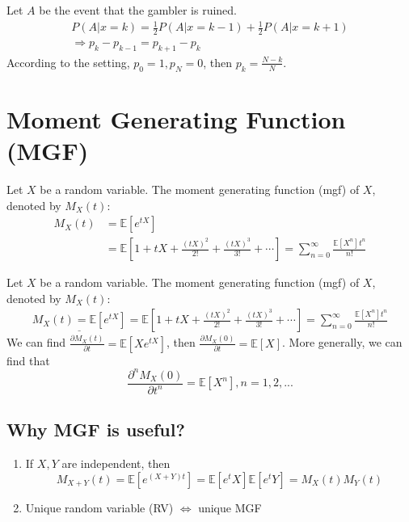 \documentclass[11pt]{elegantbook}
\begin{document}
Let $A$ be the event that the gambler is ruined.
\begin{equation}
    \begin{aligned}
        P(A|x=k)=\frac{1}{2}P(A|x=k-1)+\frac{1}{2}P(A|x=k+1)\\
        \Rightarrow p_k-p_{k-1}=p_{k+1}-p_k
    \end{aligned}
    \nonumber
\end{equation}
According to the setting, $p_0=1,p_N=0$, then $p_k=\frac{N-k}{N}$.

\section{Moment Generating Function (MGF)}
\begin{definition}
    Let $X$ be a random variable. The moment generating function (mgf) of $X$, denoted by $M_X(t)$:
    \begin{equation}
        \begin{aligned}
            M_X(t)&=\mathbb{E}[e^{tX}]\\&=\mathbb{E}\left[1+tX+\frac{(tX)^2}{2!}+\frac{(tX)^3}{3!}+\cdots\right]=\sum_{n=0}^\infty\frac{\mathbb{E}[X^n]t^n}{n!}
        \end{aligned}
        \nonumber
    \end{equation}
\end{definition}
Let $X$ be a random variable. The moment generating function (mgf) of $X$, denoted by $M_X(t)$:
\begin{equation}
    \begin{aligned}
        \underline{M_X(t)=\mathbb{E}[e^{tX}]}=\mathbb{E}\left[1+tX+\frac{(tX)^2}{2!}+\frac{(tX)^3}{3!}+\cdots\right]=\sum_{n=0}^\infty\frac{\mathbb{E}[X^n]t^n}{n!}
    \end{aligned}
    \nonumber
\end{equation}
We can find $\frac{\partial M_X(t)}{\partial t}= \mathbb{E}\left[Xe^{tX}\right]$, then $\frac{\partial M_X(0)}{\partial t}= \mathbb{E}\left[X\right]$. More generally, we can find that $$\frac{\partial^n M_X(0)}{\partial t^n}= \mathbb{E}\left[X^n\right],n=1,2,...$$
\subsection*{Why MGF is useful?}
\begin{enumerate}[(1)]
    \item If $X,Y$ are independent, then $$M_{X+Y}(t)=\mathbb{E}[e^{(X+Y)t}]=\mathbb{E}[e^tX]\mathbb{E}[e^tY]=M_X(t)M_Y(t)$$
    \item Unique random variable (RV) $\Leftrightarrow$ unique MGF
\end{enumerate}
\end{document}
